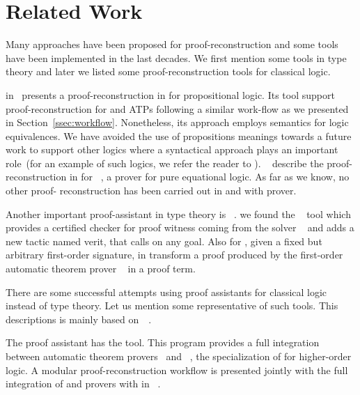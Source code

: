 \documentclass[../main.tex]{subfiles}
\begin{document}

\section{Related Work}
\label{sec:related-work}

Many approaches have been proposed for proof-reconstruction and some tools have
been implemented in the last decades. We first mention some tools in type
theory and later we listed some proof-reconstruction tools for classical logic.

\citeauthor{Kanso2012} in~\cite{Kanso2012,kanso2016light} presents a
proof-reconstruction in \Agda for propositional logic. Its tool support
proof-reconstruction for  and  ATPs following a similar work-flow as we presented in Section~\ref{ssec:workflow}.
Nonetheless, its approach
employs semantics for logic equivalences. We have avoided the use of
propositions meanings towards a future work to support other logics where a
syntactical approach plays an important role~(for an example of such logics, we
refer the reader to \cite{Agudelo-Agudelo2017}).
\citeauthor{foster2011integrating}~\cite{foster2011integrating} describe  the
proof-reconstruction in \Agda for ~\cite{hillenbrand1997}, a
prover for pure equational logic. As far as we know, no other proof-
reconstruction has been carried out in \Agda and with \Metis prover.

Another important proof-assistant in type theory is ~\cite{coqteam}.
we found the ~\cite{armand2011,Ekici2017} tool which provides a
certified checker for proof witness coming from the \SMT solver
~\cite{bouton2009} and adds a new tactic named verit, that calls
 on any  goal. Also for , given a fixed but
arbitrary first-order signature, \citeauthor{Bezem2002} in \cite{Bezem2002}
transform a proof produced by the first-order automatic theorem prover
~\cite{deNivelle2003} in a  proof term.

There are some successful attempts using proof assistants for classical logic
instead of type theory.
Let us mention some representative of such tools. This descriptions is
mainly based on~\citeauthor{Sicard-Ramirez2016}~\cite{Sicard-Ramirez2016}.

The  proof assistant has the  tool.
This program provides a full integration between
automatic theorem provers~\cite{blanchette2013extending,Fleury2014,bohme2010} and
~\cite{nipkow2002isabelle}, the specialization of
 for higher-order logic.
A modular proof-reconstruction workflow is presented jointly with
the full integration of  and  provers with
 in \citeauthor{Een2004}~\cite{Een2004}.
\end{document}
